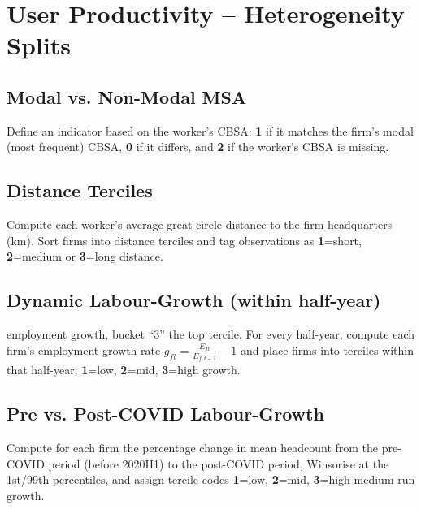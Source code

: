 \documentclass{article}
\newcommand{\cleanedresultsdir}{../../results/cleaned}
\begin{document}
\clearpage
\section{User Productivity – Heterogeneity Splits}

\subsection{Modal vs. Non-Modal MSA}
Define an indicator based on the worker’s CBSA: \textbf{1} if it matches the
firm’s modal (most frequent) CBSA, \textbf{0} if it differs, and \textbf{2}
if the worker’s CBSA is missing.


\subsection{Distance Terciles}
Compute each worker’s average great-circle distance to the firm headquarters
(km).  Sort firms into distance terciles and tag observations as
\textbf{1}=short, \textbf{2}=medium or \textbf{3}=long distance.


\subsection{Dynamic Labour-Growth (within half-year)}
employment growth, bucket ``3'' the top tercile.
For every half-year, compute each firm’s employment growth rate
$g_{ft}=\tfrac{E_{ft}}{E_{f,t-1}}-1$ and place firms into terciles within that
half-year: \textbf{1}=low, \textbf{2}=mid, \textbf{3}=high growth.


\subsection{Pre vs. Post-COVID Labour-Growth}
Compute for each firm the percentage change in mean headcount from the
pre-COVID period (before 2020H1) to the post-COVID period, Winsorise at the
1st/99th percentiles, and assign tercile codes \textbf{1}=low, \textbf{2}=mid,
\textbf{3}=high medium-run growth.

\end{document}
